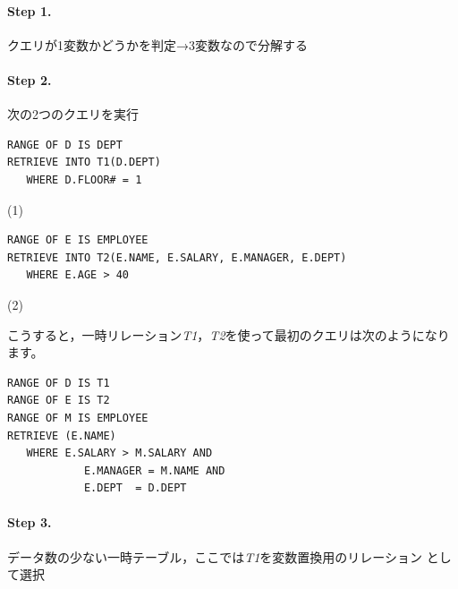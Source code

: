 \paragraph{Step 1. }
クエリが1変数かどうかを判定→3変数なので分解する

\paragraph{Step 2. }
次の2つのクエリを実行

\begin{center}
 \begin{minipage}{0.8\textwidth}
  \begin{lstlisting}
RANGE OF D IS DEPT
RETRIEVE INTO T1(D.DEPT)
   WHERE D.FLOOR# = 1
  \end{lstlisting}
 \end{minipage}
 \begin{minipage}{0.05\textwidth}
  (1)
 \end{minipage}

 \begin{minipage}{0.8\textwidth}
  \begin{lstlisting}
RANGE OF E IS EMPLOYEE
RETRIEVE INTO T2(E.NAME, E.SALARY, E.MANAGER, E.DEPT)
   WHERE E.AGE > 40
  \end{lstlisting}
 \end{minipage}
 \begin{minipage}{0.05\textwidth}
  (2)
 \end{minipage}
\end{center}

こうすると，一時リレーション{\it T1}，{\it T2}を使って最初のクエリは次のようになります。

\begin{center}
 \begin{minipage}{0.8\textwidth}
  \begin{lstlisting}
RANGE OF D IS T1
RANGE OF E IS T2
RANGE OF M IS EMPLOYEE
RETRIEVE (E.NAME)
   WHERE E.SALARY > M.SALARY AND
            E.MANAGER = M.NAME AND
            E.DEPT  = D.DEPT
  \end{lstlisting}
 \end{minipage}
\end{center}

\paragraph{Step 3.}
データ数の少ない一時テーブル，ここでは{\it T1}を変数置換用のリレーション
として選択

